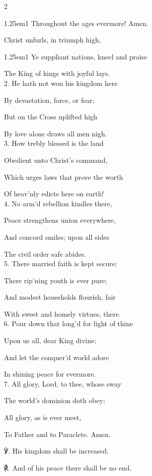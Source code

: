 \begin{paracol}{2}
\begin{hangparas}{1.25em}{1}
Throughout the ages evermore! Amen.
\end{hangparas}

\mattinsOfficeHymn
{} Christ unfurls, in triumph high,


\begin{hangparas}{1.25em}{1}
Ye suppliant nations, kneel and praise

The King of kings with joyful lays.\\

2. He hath not won his kingdom here

By devastation, force, or fear;

But on the Cross uplifted high

By love alone draws all men nigh.\\

3. How trebly blessed is the land

Obedient unto Christ’s command,

Which urges laws that prove the worth

Of heav'nly edicts here on earth!\\

4. No arm'd rebellion kindles there,

Peace strengthens union everywhere,

And concord smiles; upon all sides

The civil order safe abides.\\

5. There married faith is kept secure;

There rip'ning youth is ever pure;

And modest households flourish, fair

With sweet and homely virtues, there.\\

6. Pour down that long'd for light of thine

Upon us all, dear King divine;

And let the conquer'd world adore

In shining peace for evermore.\\

7. All glory, Lord, to thee, whose sway

The world’s dominion doth obey;

All glory, as is ever meet,

To Father and to Paraclete. Amen.\\
\end{hangparas}

℣. His kingdom shall be increased.

℟. And of his peace there shall be no end.


\fussy	
\end{paracol}


